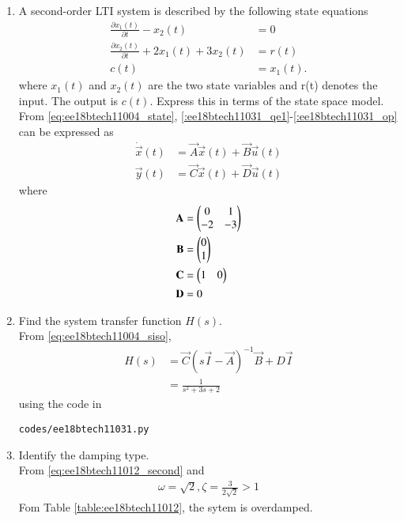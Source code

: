 \begin{enumerate}[label=\thesubsection.\arabic*.,ref=\thesubsection.\theenumi]

\item A second-order LTI system is described by the following state equations
\begin{align}
\label{:ee18btech11031_qe1}
\frac{\partial x_1(t)}{\partial t} - x_2(t) &= 0
\\
\label{:ee18btech11031_qe2}
\frac{\partial x_2(t)}{\partial t} + 2x_1(t) + 3x_2(t) &= r(t)
\\
c(t) &= x_1(t).
\label{:ee18btech11031_op}
\end{align}
%
where $x_1(t)$ and $x_2(t)$ are the two state variables and r(t) denotes the input. The output is $c(t)$.  Express this in terms of the state space model.
%
\\
\solution From \eqref{eq:ee18btech11004_state}, \eqref{:ee18btech11031_qe1}-\eqref{:ee18btech11031_op} can be expressed as
%
\begin{align}
\dot{\vec{x}}(t)&=\vec{A}\vec{x}(t)+\vec{B}\vec{u}(t) \\
 \vec{y}(t)&=\vec{C}\vec{x}(t)+\vec{D} \vec{u}(t)
\end{align}
%
where
\begin{align}
    \mathbf{A} &= \begin{pmatrix}0&1\\-2&-3\end{pmatrix}
\\
    \mathbf{B} &= \begin{pmatrix}0\\1\end{pmatrix}
\\
    \mathbf{C} &= \begin{pmatrix}1&0\end{pmatrix}
\\
    \mathbf{D} &= 0
\end{align}

\item Find the system transfer function $H(s)$.
%
\\
\solution From \eqref{eq:ee18btech11004_siso},
%
\begin{align}
H(s) &=  \vec{C}{(s\vec{I}-\vec{A})^{-1}}\vec{B}+D\vec{I}
\\
&  = \frac{1}{s^{2}+3s+2}
\label{eq:ee18btech11031_H}
\end{align}
%
using the code in 
\begin{lstlisting}
codes/ee18btech11031.py
\end{lstlisting}
%
\item Identify the damping type.
\\
\solution From \eqref{eq:ee18btech11012_second} and \label{eq:ee18btech11031_H}
%
\begin{align}
\omega = \sqrt{2}, \zeta = \frac{3}{2\sqrt{2}} > 1
\end{align}
Fom Table \ref{table:ee18btech11012}, the sytem is overdamped.
%
\end{enumerate}
